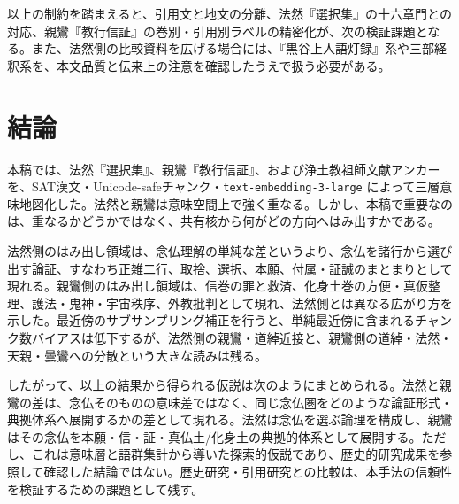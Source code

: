 \documentclass[uplatex,dvipdfmx,11pt,a4paper]{jsarticle}
\begin{document}
以上の制約を踏まえると、引用文と地文の分離、法然『選択集』の十六章門との対応、親鸞『教行信証』の巻別・引用別ラベルの精密化が、次の検証課題となる。また、法然側の比較資料を広げる場合には、『黒谷上人語灯録』系や三部経釈系を、本文品質と伝来上の注意を確認したうえで扱う必要がある。

\section{結論}

本稿では、法然『選択集』、親鸞『教行信証』、および浄土教祖師文献アンカーを、SAT漢文・Unicode-safeチャンク・\texttt{text-embedding-3-large} によって三層意味地図化した。法然と親鸞は意味空間上で強く重なる。しかし、本稿で重要なのは、重なるかどうかではなく、共有核から何がどの方向へはみ出すかである。

法然側のはみ出し領域は、念仏理解の単純な差というより、念仏を諸行から選び出す論証、すなわち正雑二行、取捨、選択、本願、付属・証誠のまとまりとして現れる。親鸞側のはみ出し領域は、信巻の罪と救済、化身土巻の方便・真仮整理、護法・鬼神・宇宙秩序、外教批判として現れ、法然側とは異なる広がり方を示した。最近傍のサブサンプリング補正を行うと、単純最近傍に含まれるチャンク数バイアスは低下するが、法然側の親鸞・道綽近接と、親鸞側の道綽・法然・天親・曇鸞への分散という大きな読みは残る。

したがって、以上の結果から得られる仮説は次のようにまとめられる。法然と親鸞の差は、念仏そのものの意味差ではなく、同じ念仏圏をどのような論証形式・典拠体系へ展開するかの差として現れる。法然は念仏を選ぶ論理を構成し、親鸞はその念仏を本願・信・証・真仏土/化身土の典拠的体系として展開する。ただし、これは意味層と語群集計から導いた探索的仮説であり、歴史的研究成果を参照して確認した結論ではない。歴史研究・引用研究との比較は、本手法の信頼性を検証するための課題として残す。
\end{document}

